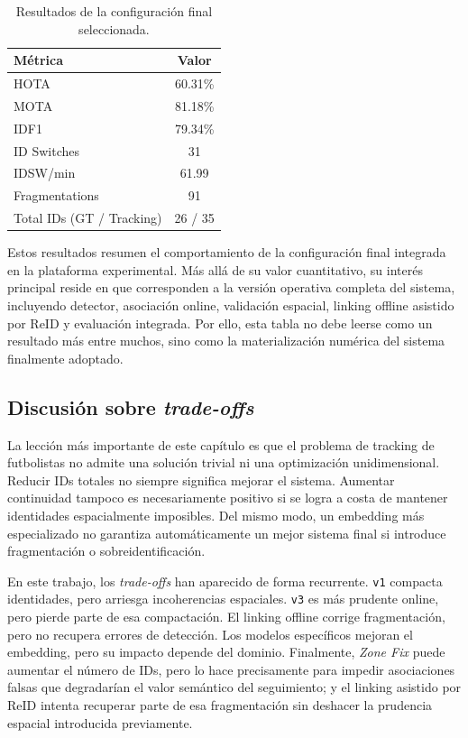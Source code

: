 \documentclass[../MAIN.tex]{subfiles}
\begin{document}
	\begin{table}[H]
		\centering
		\caption{Resultados de la configuración final seleccionada.}
		\label{tab:cap13_resultados_finales}
		\begin{tabular}{lc}
			\toprule
			\textbf{Métrica} & \textbf{Valor} \\
			\midrule
			HOTA & 60.31\% \\
			MOTA & 81.18\% \\
			IDF1 & 79.34\% \\
			ID Switches & 31 \\
			IDSW/min & 61.99 \\
			Fragmentations & 91 \\
			Total IDs (GT / Tracking) & 26 / 35 \\
			\bottomrule
		\end{tabular}
	\end{table}
	
	Estos resultados resumen el comportamiento de la configuración final integrada en la plataforma experimental. Más allá de su valor cuantitativo, su interés principal reside en que corresponden a la versión operativa completa del sistema, incluyendo detector, asociación online, validación espacial, linking offline asistido por ReID y evaluación integrada. Por ello, esta tabla no debe leerse como un resultado más entre muchos, sino como la materialización numérica del sistema finalmente adoptado.
	
	\subsection{Discusión sobre \textit{trade-offs}}
	
	La lección más importante de este capítulo es que el problema de tracking de futbolistas no admite una solución trivial ni una optimización unidimensional. Reducir IDs totales no siempre significa mejorar el sistema. Aumentar continuidad tampoco es necesariamente positivo si se logra a costa de mantener identidades espacialmente imposibles. Del mismo modo, un embedding más especializado no garantiza automáticamente un mejor sistema final si introduce fragmentación o sobreidentificación.
	
	En este trabajo, los \textit{trade-offs} han aparecido de forma recurrente. \texttt{v1} compacta identidades, pero arriesga incoherencias espaciales. \texttt{v3} es más prudente online, pero pierde parte de esa compactación. El linking offline corrige fragmentación, pero no recupera errores de detección. Los modelos específicos mejoran el embedding, pero su impacto depende del dominio. Finalmente, \textit{Zone Fix} puede aumentar el número de IDs, pero lo hace precisamente para impedir asociaciones falsas que degradarían el valor semántico del seguimiento; y el linking asistido por ReID intenta recuperar parte de esa fragmentación sin deshacer la prudencia espacial introducida previamente.
	
\end{document}
